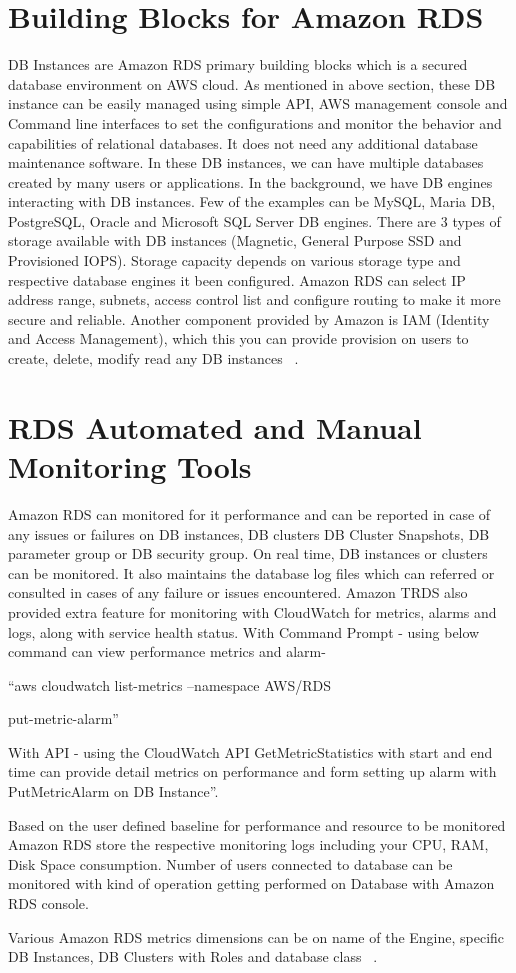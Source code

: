 \section{Building Blocks for Amazon RDS}

DB Instances are Amazon RDS primary building blocks which is a secured database 
environment on AWS cloud. As mentioned in above section, these DB instance can be 
easily managed using simple API, AWS management console and Command line interfaces 
to set the configurations and monitor the behavior and capabilities of relational 
databases. It does not need any additional database maintenance software.
In these DB instances, we can have multiple databases created by many users or 
applications.
In the background, we have DB engines interacting with DB instances. Few of the 
examples can be MySQL, Maria DB, PostgreSQL, Oracle and Microsoft SQL Server DB 
engines.
There are 3 types of storage available with DB instances (Magnetic, General 
Purpose SSD and Provisioned IOPS).
Storage capacity depends on various storage type and respective database engines 
it been configured.
Amazon RDS can select IP address range, subnets, access control list and 
configure routing to make it more secure and reliable.
Another component provided by Amazon is IAM (Identity and Access Management), 
which this you can provide provision on users to create, delete, modify read 
any DB instances
~\cite{hid-sp18-520-amazonrdswel}.

\section{RDS Automated and Manual Monitoring Tools}

Amazon RDS can monitored for it performance and can be reported in case of 
any issues or failures on DB instances, DB clusters DB Cluster Snapshots, DB 
parameter group or DB security group.
On real time, DB instances or clusters can be monitored. It also maintains the 
database log files which can referred or consulted in cases of any failure or 
issues encountered.
Amazon TRDS also provided extra feature for monitoring with CloudWatch for 
metrics, alarms and logs, along with service health status.
With Command Prompt - using below command can view performance metrics and 
alarm- 

``aws cloudwatch list-metrics --namespace AWS/RDS

put-metric-alarm''

With API - using the CloudWatch API GetMetricStatistics with start and end time 
can provide detail metrics on performance and form setting up alarm 
with PutMetricAlarm on DB Instance''.

Based on the user defined baseline for performance and resource to be monitored 
Amazon RDS store the respective monitoring logs including your CPU, RAM, Disk 
Space consumption.
Number of users connected to database can be monitored with kind of operation 
getting performed on Database with Amazon RDS console.  

Various Amazon RDS metrics dimensions can be on name of the Engine, specific 
DB Instances, DB Clusters with Roles and database class
~\cite{hid-sp18-520-amardsmon}.


 